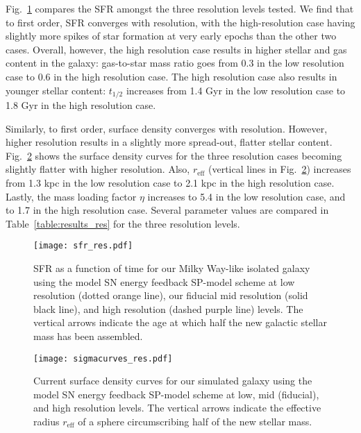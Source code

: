 \documentclass[iop]{emulateapj}
\begin{document}


Fig.~\ref{fig:SFR_res} compares the SFR amongst the three resolution levels tested. We find that to first order, SFR converges with resolution, with the high-resolution case having slightly more spikes of star formation at very early epochs than the other two cases. Overall, however, the high resolution case results in higher stellar and gas content in the galaxy: gas-to-star mass ratio goes from 0.3 in the low resolution case to 0.6 in the high resolution case. The high resolution case also results in younger stellar content: $t_{1/2}$ increases from 1.4 Gyr in the low resolution case to 1.8 Gyr in the high resolution case.

Similarly, to first order, surface density converges with resolution. However, higher resolution results in a slightly more spread-out, flatter stellar content. Fig.~\ref{fig:sigmacurves_res} shows the surface density curves for the three resolution cases becoming slightly flatter with higher resolution. Also, $r_{\mathrm{eff}}$ (vertical lines in Fig.~\ref{fig:sigmacurves_res}) increases from 1.3 kpc in the low resolution case to 2.1 kpc in the high resolution case. Lastly, the mass loading factor $\eta$ increases to 5.4 in the low resolution case, and to 1.7 in the high resolution case. Several parameter values are compared in Table~\ref{table:results_res} for the three resolution levels.

\begin{figure}
\texttt{[image: sfr\_res.pdf]}
\caption{SFR as a function of time for our Milky Way-like isolated galaxy using the model SN energy feedback SP-model scheme at low resolution (dotted orange line), our fiducial mid resolution (solid black line), and high resolution (dashed purple line) levels. The vertical arrows indicate the age at which half the new galactic stellar mass has been assembled.}
\label{fig:SFR_res}
\end{figure}

\begin{figure}
\texttt{[image: sigmacurves\_res.pdf]}
\caption{Current surface density curves for our simulated galaxy using the model SN energy feedback SP-model scheme at low, mid (fiducial), and high resolution levels. The vertical arrows indicate the effective radius $r_{\mathrm{eff}}$ of a sphere circumscribing half of the new stellar mass.}
\label{fig:sigmacurves_res}
\end{figure}


 
\end{document}
